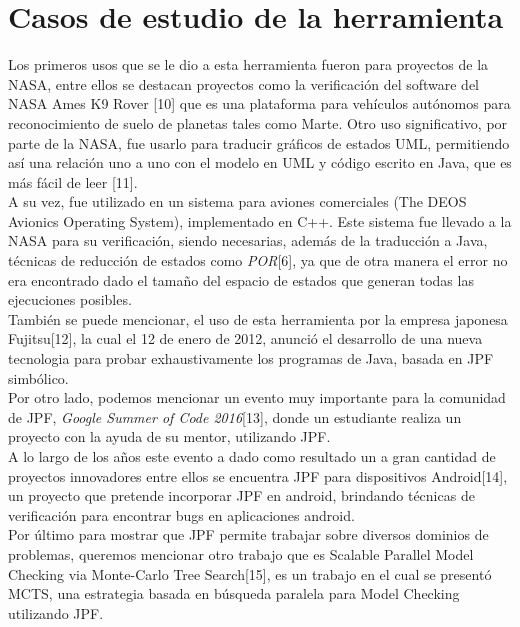 \documentclass[runningheads]{llncs}
\begin{document}
\section{Casos de estudio de la herramienta}

Los primeros usos que se le dio a esta herramienta fueron para proyectos de la NASA, entre ellos se destacan proyectos como la verificaci\'on del software del NASA Ames K9 Rover [10] que es una plataforma para veh\'iculos aut\'onomos para reconocimiento de suelo de planetas tales como Marte.
Otro uso significativo, por parte de la NASA, fue usarlo para traducir gr\'aficos de estados UML, permitiendo as\'i una relaci\'on uno a uno con el modelo en UML y c\'odigo escrito en Java, que es m\'as f\'acil de leer [11].\\
A su vez, fue utilizado en un sistema para aviones comerciales (The DEOS Avionics Operating System), implementado en C++. Este sistema fue llevado a la NASA para su verificaci\'on, siendo necesarias, adem\'as de la traducci\'on a Java, t\'ecnicas de reducci\'on de estados como \textit{POR}[6], ya que de otra manera el error no era encontrado dado el tama\~no del espacio de estados que generan todas las ejecuciones posibles.\\
Tambi\'en se puede mencionar, el uso de esta herramienta por la empresa japonesa Fujitsu[12], la cual el 12 de enero de 2012, anunci\'o el desarrollo de una nueva tecnologia para probar exhaustivamente los programas de Java, basada en JPF simb\'olico. \\
Por otro lado, podemos mencionar un evento muy importante para la comunidad de JPF, \textit{Google Summer of Code 2016}[13], donde un estudiante realiza un proyecto con la ayuda de su mentor, utilizando JPF.\\
A lo largo de los a\~nos  este evento a dado como resultado un a gran cantidad de proyectos innovadores entre ellos se encuentra JPF para dispositivos Android[14], un proyecto que pretende incorporar JPF en android, brindando t\'ecnicas de verificaci\'on para encontrar bugs en aplicaciones android.\\
Por \'ultimo para mostrar que JPF permite trabajar sobre diversos dominios de problemas, queremos mencionar otro trabajo que es Scalable Parallel Model Checking via Monte-Carlo Tree Search[15], es un trabajo en el cual se present\'o MCTS, una estrategia basada en b\'usqueda paralela para Model Checking utilizando JPF.\\
\end{document}
